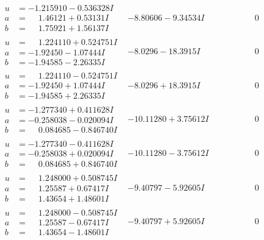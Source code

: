 \documentclass[1p]{elsarticle_modified}
\theoremstyle{definition}
\begin{document}
$$\begin{array}{c|c|c}
\begin{aligned}
u &= -1.215910 - 0.536328 I \\
a &= \phantom{-}1.46121 + 0.53131 I \\
b &= \phantom{-}1.75921 + 1.56137 I\end{aligned}
 & -8.80606 - 9.34534 I & \phantom{-0.000000 } 0 \\ \hline\begin{aligned}
u &= \phantom{-}1.224110 + 0.524751 I \\
a &= -1.92450 - 1.07444 I \\
b &= -1.94585 - 2.26335 I\end{aligned}
 & -8.0296 - 18.3915 I & \phantom{-0.000000 } 0 \\ \hline\begin{aligned}
u &= \phantom{-}1.224110 - 0.524751 I \\
a &= -1.92450 + 1.07444 I \\
b &= -1.94585 + 2.26335 I\end{aligned}
 & -8.0296 + 18.3915 I & \phantom{-0.000000 } 0 \\ \hline\begin{aligned}
u &= -1.277340 + 0.411628 I \\
a &= -0.258038 - 0.020094 I \\
b &= \phantom{-}0.084685 - 0.846740 I\end{aligned}
 & -10.11280 + 3.75612 I & \phantom{-0.000000 } 0 \\ \hline\begin{aligned}
u &= -1.277340 - 0.411628 I \\
a &= -0.258038 + 0.020094 I \\
b &= \phantom{-}0.084685 + 0.846740 I\end{aligned}
 & -10.11280 - 3.75612 I & \phantom{-0.000000 } 0 \\ \hline\begin{aligned}
u &= \phantom{-}1.248000 + 0.508745 I \\
a &= \phantom{-}1.25587 + 0.67417 I \\
b &= \phantom{-}1.43654 + 1.48601 I\end{aligned}
 & -9.40797 - 5.92605 I & \phantom{-0.000000 } 0 \\ \hline\begin{aligned}
u &= \phantom{-}1.248000 - 0.508745 I \\
a &= \phantom{-}1.25587 - 0.67417 I \\
b &= \phantom{-}1.43654 - 1.48601 I\end{aligned}
 & -9.40797 + 5.92605 I & \phantom{-0.000000 } 0\\

\end{array}$$
\end{document}
